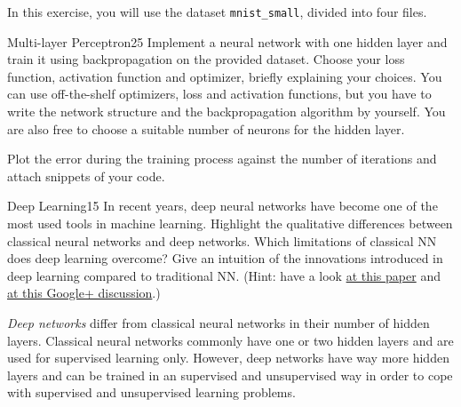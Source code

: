\newif\ifvimbug
\vimbugfalse

\ifvimbug

\fi

In this exercise, you will use the dataset \texttt{mnist\_small}, divided into four files.

\begin{questions}


\begin{question}{Multi-layer Perceptron}{25}
Implement a neural network with one hidden layer and train it using backpropagation on the provided dataset. Choose your loss function, activation function and optimizer, briefly explaining your choices. You can use off-the-shelf optimizers, loss and activation functions, but you have to write the network structure and the backpropagation algorithm by yourself. You are also free to choose a suitable number of neurons for the hidden layer.

Plot the error during the training process against the number of iterations and attach snippets of your code. 

\begin{answer}\end{answer}

\end{question}


\begin{question}[bonus]{Deep Learning}{15}
In recent years, deep neural networks have become one of the most used tools in machine learning. 
Highlight the qualitative differences between classical neural networks and deep networks. Which limitations of classical NN does deep learning overcome?
Give an intuition of the innovations introduced in deep learning compared to traditional NN.
(Hint: have a look \href{http://arxiv.org/abs/1206.5538}{at this paper} and \href{https://plus.google.com/100849856540000067209/posts/9BDtGwCDL7D}{at this Google+ discussion}.)

\begin{answer}
\emph{Deep networks} differ from classical neural networks in their number of hidden layers. Classical neural networks commonly have one or two hidden layers and are used for supervised learning only. However, deep networks have way more hidden layers and can be trained in an supervised and unsupervised way in order to cope with supervised and unsupervised learning problems.\\


\end{answer}
\end{question}
\end{questions}
